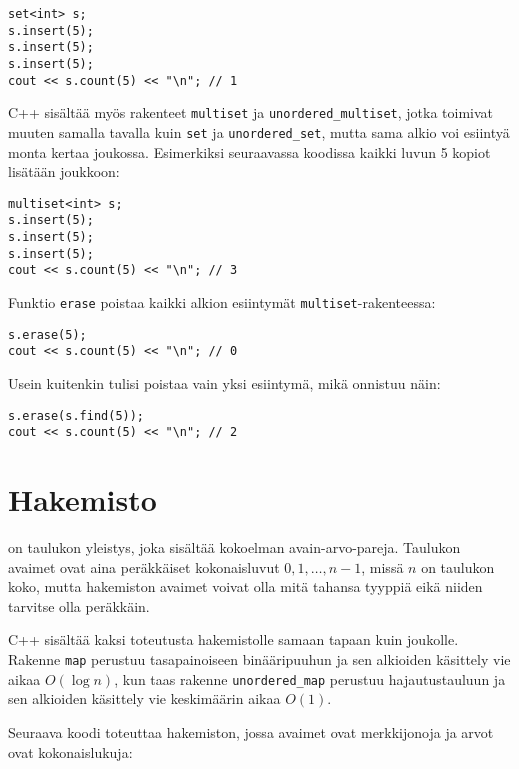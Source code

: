 \begin{lstlisting}
set<int> s;
s.insert(5);
s.insert(5);
s.insert(5);
cout << s.count(5) << "\n"; // 1
\end{lstlisting}


C++ sisältää myös rakenteet
\texttt{multiset} ja \texttt{unordered\_multiset},
jotka toimivat muuten samalla tavalla kuin \texttt{set}
ja \texttt{unordered\_set},
mutta sama alkio voi esiintyä
monta kertaa joukossa.
Esimerkiksi seuraavassa koodissa
kaikki luvun 5 kopiot lisätään joukkoon:

\begin{lstlisting}
multiset<int> s;
s.insert(5);
s.insert(5);
s.insert(5);
cout << s.count(5) << "\n"; // 3
\end{lstlisting}

Funktio \texttt{erase} poistaa
kaikki alkion esiintymät
\texttt{multiset}-rakenteessa:
\begin{lstlisting}
s.erase(5);
cout << s.count(5) << "\n"; // 0
\end{lstlisting}
Usein kuitenkin tulisi poistaa
vain yksi esiintymä,
mikä onnistuu näin:
\begin{lstlisting}
s.erase(s.find(5));
cout << s.count(5) << "\n"; // 2
\end{lstlisting}

\section{Hakemisto}


 on taulukon yleistys,
joka sisältää kokoelman avain-arvo-pareja.
Taulukon avaimet ovat aina peräkkäiset
kokonaisluvut $0,1,\ldots,n-1$,
missä $n$ on taulukon koko,
mutta hakemiston avaimet voivat
olla mitä tahansa tyyppiä
eikä niiden tarvitse olla peräkkäin.

C++ sisältää kaksi toteutusta hakemistolle
samaan tapaan kuin joukolle.
Rakenne
\texttt{map} perustuu
tasapainoiseen binääripuuhun ja sen
alkioiden käsittely vie aikaa $O(\log n)$,
kun taas rakenne
\texttt{unordered\_map} perustuu
hajautustauluun ja sen alkioiden
käsittely vie keskimäärin aikaa $O(1)$.

Seuraava koodi toteuttaa hakemiston,
jossa avaimet ovat merkkijonoja ja
arvot ovat kokonaislukuja:

